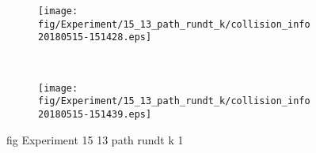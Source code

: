 \begin{figure}[H]
	\centering
	\begin{subfigure}[b]{0.45\textwidth}
		\texttt{[image: fig/Experiment/15\_13\_path\_rundt\_k/collision\_info20180515-151428.eps]}
		\caption{}
		\label{fig:Experiment:15_13_path_rundt_k:collision_info20180515-151428}
	\end{subfigure}
	~
	\begin{subfigure}[b]{0.45\textwidth}
		\texttt{[image: fig/Experiment/15\_13\_path\_rundt\_k/collision\_info20180515-151439.eps]}
		\caption{}
		\label{fig:Experiment:15_13_path_rundt_k:collision_info20180515-151439}
	\end{subfigure}
	\caption{fig Experiment 15 13 path rundt k 1}
	\label{fig:Experiment:15_13_path_rundt_k:1}
\end{figure}

